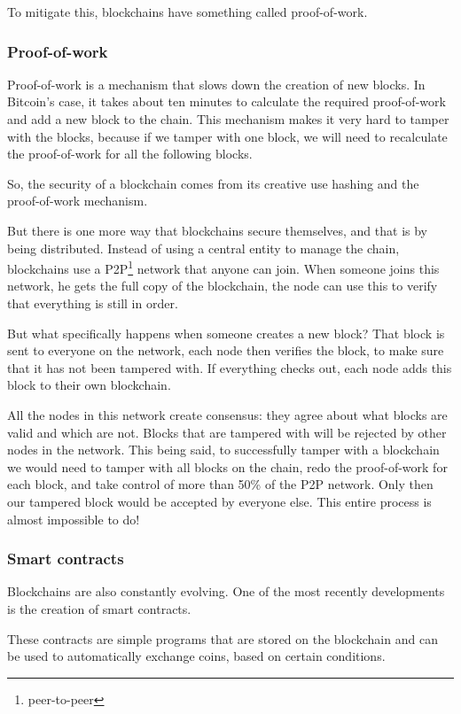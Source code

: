 \documentclass{article}
\newcommand\tab[1][1cm]{\hspace*{#1}}
\begin{document}
To mitigate this, blockchains have something called proof-of-work.

\subsubsection{Proof-of-work}

\tab Proof-of-work is a mechanism that slows down the creation of new blocks. In Bitcoin's case, it takes about ten minutes to calculate the required proof-of-work and add a new block to the chain. This mechanism makes it very hard to tamper with the blocks, because if we tamper with one block, we will need to recalculate the proof-of-work for all the following blocks.

So, the security of a blockchain comes from its creative use hashing and the proof-of-work mechanism.

But there is one more way that blockchains secure themselves, and that is by being distributed. Instead of using a central entity to manage the chain, blockchains use a P2P\footnote{peer-to-peer} network that anyone can join. When someone joins this network, he gets the full copy of the blockchain, the node can use this to verify that everything is still in order.

But what specifically happens when someone creates a new block? That block is sent to everyone on the network, each node then verifies the block, to make sure that it has not been tampered with. If everything checks out, each node adds this block to their own blockchain. 

All the nodes in this network create consensus: they agree about what blocks are valid and which are not. Blocks that are tampered with will be rejected by other nodes in the network. This being said, to successfully tamper with a blockchain we would need to tamper with all blocks on the chain, redo the proof-of-work for each block, and take control of more than 50\% of the P2P network. Only then our tampered block would be accepted by everyone else. This entire process is almost impossible to do!

\subsubsection{Smart contracts}

\tab Blockchains are also constantly evolving. One of the most recently developments is the creation of smart contracts.

These contracts are simple programs that are stored on the blockchain and can be used to automatically exchange coins, based on certain conditions.
\end{document}
